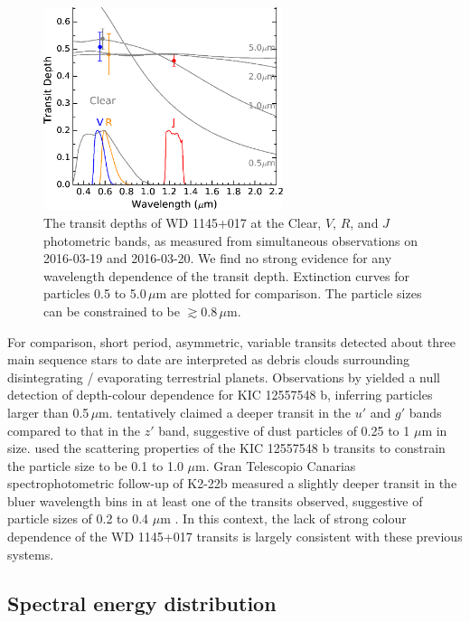 \documentclass[useAMS,usenatbib]{mn2e}
\begin{document}
\begin{figure}
    \centering
    \includegraphics[width=7cm]{plots/band_depth.eps}
    \caption{The transit depths of WD 1145+017 at the Clear, $V$, $R$, and $J$ photometric bands, as measured from simultaneous observations on 2016-03-19 and 2016-03-20. We find no strong evidence for any wavelength dependence of the transit depth. Extinction curves for particles 0.5 to 5.0\,$\mu$m are plotted for comparison. The particle sizes can be constrained to be $\gtrsim 0.8\,\mu$m.}
    \label{fig:band_depth}
\end{figure}

For comparison, short period, asymmetric, variable transits detected about three main sequence stars to date \citep{2012ApJ...752....1R,2014ApJ...784...40R,2015ApJ...812..112S} are interpreted as debris clouds surrounding disintegrating / evaporating terrestrial planets. Observations by \citet{2014ApJ...786..100C} yielded a null detection of depth-colour dependence for KIC 12557548 b, inferring particles larger than 0.5\,$\mu$m. \citet{2015ApJ...800L..21B} tentatively claimed a deeper transit in the $u'$ and $g'$ bands compared to that in the $z'$ band, suggestive of dust particles of 0.25 to 1 $\mu$m in size. \citet{2013A&A...557A..72B} used the scattering properties of the KIC 12557548 b transits to constrain the particle size to be 0.1 to 1.0 $\mu$m. Gran Telescopio Canarias spectrophotometric follow-up of K2-22b measured a slightly deeper transit in the bluer wavelength bins in at least one of the transits observed, suggestive of particle sizes of 0.2 to 0.4 $\mu$m \citep{2015ApJ...812..112S}.  In this context, the lack of strong colour dependence of the WD 1145+017 transits is largely consistent with these previous systems.

\subsection{Spectral energy distribution}
\end{document}
